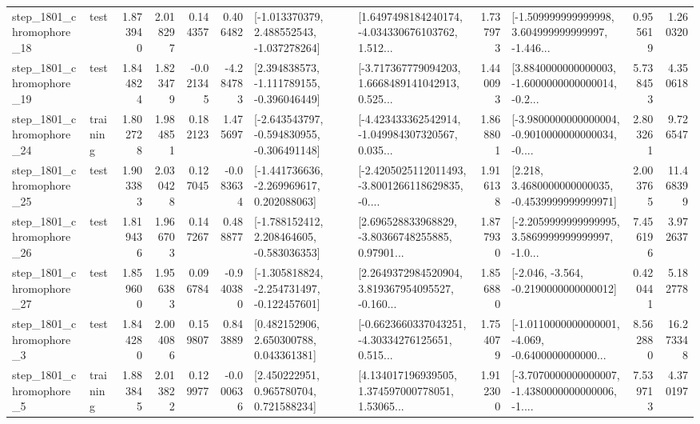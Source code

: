 \begin{tabular}{llrrrrllrlrr}
 step\_1801\_chromophore\_18 &      test &      1.873940 &    2.018297 &      0.144357 &  0.406482 &   [-1.013370379, 2.488552543, -1.037278264] &  [1.6497498184240174, -4.034330676103762, 1.512... &       1.737973 &  [-1.509999999999998, 3.604999999999997, -1.446... &            0.955619 &          1.260320 \\
 step\_1801\_chromophore\_19 &      test &      1.844824 &    1.823479 &     -0.021345 & -4.284783 &   [2.394838573, -1.111789155, -0.396046449] &  [-3.717367779094203, 1.6668489141042913, 0.525... &       1.440093 &  [3.8840000000000003, -1.6000000000000014, -0.2... &            5.738453 &          4.350618 \\
 step\_1801\_chromophore\_24 &  training &      1.802728 &    1.984851 &      0.182123 &  1.475697 &  [-2.643543797, -0.594830955, -0.306491148] &  [-4.423433362542914, -1.049984307320567, 0.035... &       1.868801 &  [-3.9800000000000004, -0.9010000000000034, -0.... &            2.803261 &          9.726547 \\
 step\_1801\_chromophore\_25 &      test &      1.903383 &    2.030428 &      0.127045 & -0.083634 &   [-1.441736636, -2.269969617, 0.202088063] &  [-2.4205025112011493, -3.8001266118629835, -0.... &       1.916138 &   [2.218, 3.4680000000000035, -0.4539999999999971] &            2.003765 &         11.468399 \\
 step\_1801\_chromophore\_26 &      test &      1.819436 &    1.966703 &      0.147267 &  0.488877 &   [-1.788152412, 2.208464605, -0.583036353] &  [2.696528833968829, -3.80366748255885, 0.97901... &       1.877930 &  [-2.2059999999999995, 3.5869999999999997, -1.0... &            7.456196 &          3.972637 \\
 step\_1801\_chromophore\_27 &      test &      1.859600 &    1.956383 &      0.096784 & -0.940380 &  [-1.305818824, -2.254731497, -0.122457601] &  [2.2649372984520904, 3.819367954095527, -0.160... &       1.856880 &              [-2.046, -3.564, -0.2190000000000012] &            0.420441 &          5.182778 \\
  step\_1801\_chromophore\_3 &      test &      1.844280 &    2.004086 &      0.159807 &  0.843889 &     [0.482152906, 2.650300788, 0.043361381] &  [-0.6623660337043251, -4.30334276125651, 0.515... &       1.754079 &  [-1.0110000000000001, -4.069, -0.6400000000000... &            8.562880 &         16.273348 \\
  step\_1801\_chromophore\_5 &  training &      1.883845 &    2.013822 &      0.129977 & -0.000636 &     [2.450222951, 0.965780704, 0.721588234] &  [4.134017196939505, 1.374597000778051, 1.53065... &       1.912300 &  [-3.7070000000000007, -1.4380000000000006, -1.... &            7.539713 &          4.370197 \\

\end{tabular}
